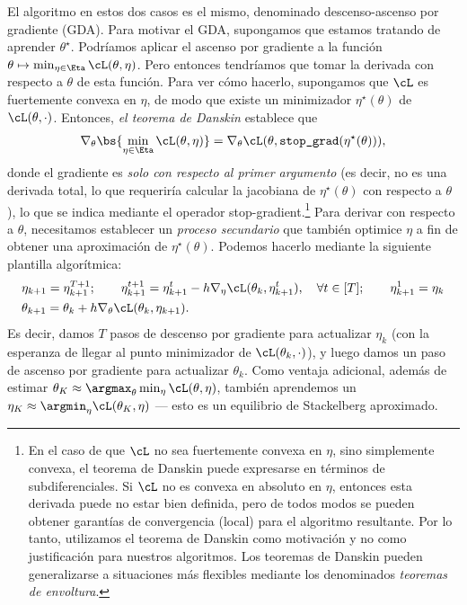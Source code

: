 \documentclass[../../book-main_es.tex]{subfiles}
\begin{document}
El algoritmo en estos dos casos es el mismo, denominado
descenso-ascenso por gradiente (GDA). Para motivar el GDA, supongamos que estamos tratando
de aprender \(\theta^{\star}\). Podríamos aplicar el ascenso por gradiente a la
función \(\theta \mapsto \min_{\eta \in \Eta}\cL(\theta, \eta)\).
Pero entonces tendríamos que tomar la derivada con respecto a \(\theta\) de esta
función. Para ver cómo hacerlo, supongamos que \(\cL\) es fuertemente
convexa en \(\eta\), de modo que existe un minimizador
\(\eta^{\star}(\theta)\) de \(\cL(\theta, \cdot)\). Entonces,
\textit{el teorema de Danskin} establece que
\begin{equation}
    \nabla_{\theta}\bs{\min_{\eta \in \Eta}\cL(\theta, \eta)} =
    \nabla_{\theta}\cL(\theta, \texttt{stop\_grad}(\eta^{\star}(\theta))),
\end{equation}
donde el gradiente es \textit{solo con respecto al primer
argumento} (es decir, no es una derivada total, lo que requeriría calcular
la jacobiana de \(\eta^{\star}(\theta)\) con respecto a \(\theta\)),
lo que se indica mediante el operador stop-gradient.\footnote{En el caso de que
    \(\cL\) no sea fuertemente convexa en \(\eta\), sino simplemente convexa,
    el teorema de Danskin puede expresarse en términos de subdiferenciales. Si
    \(\cL\) no es convexa en absoluto en \(\eta\), entonces esta derivada puede
    no estar bien definida, pero de todos modos se pueden obtener garantías de convergencia
    (local) para el algoritmo resultante. Por lo tanto, utilizamos
    el teorema de Danskin como motivación y no como justificación para nuestros
    algoritmos. Los teoremas de Danskin pueden generalizarse a situaciones más flexibles
mediante los denominados \textit{teoremas de envoltura}.}
Para derivar con respecto a \(\theta\), necesitamos establecer un
\textit{proceso secundario} que también optimice \(\eta\) a fin de obtener una
aproximación de \(\eta^{\star}(\theta)\). Podemos hacerlo mediante
la siguiente plantilla algorítmica:
\begin{align}
    &\eta_{k + 1} = \eta_{k + 1}^{T + 1}; \qquad \eta_{k + 1}^{t + 1}
    = \eta_{k + 1}^{t} - h \nabla_{\eta} \cL(\theta_{k}, \eta_{k +
    1}^{t}), \quad \forall t \in [T]; \qquad \eta_{k + 1}^{1} = \eta_{k} \\
    &\theta_{k + 1} = \theta_{k} + h \nabla_{\theta}\cL(\theta_{k},
    \eta_{k + 1}).
\end{align}
Es decir, damos \(T\) pasos de descenso por gradiente para actualizar
\(\eta_{k}\) (con la esperanza de llegar al punto minimizador de \(\cL(\theta_{k},
\cdot)\)), y luego damos un paso de ascenso por gradiente para actualizar
\(\theta_{k}\). Como ventaja adicional, además de estimar \(\theta_{K} \approx
\argmax_{\theta}\min_{\eta}\cL(\theta, \eta)\), también aprendemos un
\(\eta_{K} \approx \argmin_{\eta}\cL(\theta_{K}, \eta)\) --- esto es
un equilibrio de Stackelberg aproximado.
\end{document}

